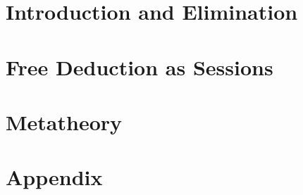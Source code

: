 \documentclass[ twoside,openright,titlepage,numbers=noenddot,headinclude,%
                footinclude=true,cleardoublepage=empty,abstractoff, %
                BCOR=5mm,paper=a4,fontsize=11pt,%
                ngerman,american,%
                ]{scrreprt}
\begin{document}
\frenchspacing
\raggedbottom
{} %
\pagestyle{plain}
% 


\cleardoublepage
\cleardoublepage
\cleardoublepage
\pagestyle{scrheadings}
\cleardoublepage

\cleardoublepage{}
\cleardoublepage
\part{Introduction and Elimination}



\cleardoublepage
\part{Free Deduction as Sessions}


\cleardoublepage
\part{Metatheory}



\appendix
\cleardoublepage
\part{Appendix}

\cleardoublepage
\cleardoublepage
\end{document}
